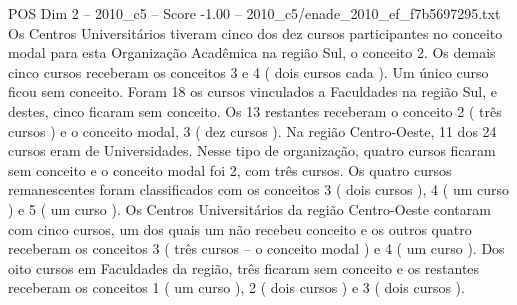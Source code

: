 \begin{textsample}{POS Dim 2 – 2010\_c5 – Score -1.00 – 2010\_c5/enade\_2010\_ef\_f7b5697295.txt}
Os Centros Universitários tiveram cinco dos dez cursos participantes no conceito modal para esta Organização Acadêmica na região Sul, o conceito 2.
Os demais cinco cursos receberam os conceitos 3 e 4 ( dois cursos cada ).
Um único curso ficou sem conceito.
Foram 18 os cursos vinculados a Faculdades na região Sul, e destes, cinco ficaram sem conceito.
Os 13 restantes receberam o conceito 2 ( três cursos ) e o conceito modal, 3 ( dez cursos ).
Na região Centro-Oeste, 11 dos 24 cursos eram de Universidades.
Nesse tipo de organização, quatro cursos ficaram sem conceito e o conceito modal foi 2, com três cursos.
Os quatro cursos remanescentes foram classificados com os conceitos 3 ( dois cursos ), 4 ( um curso ) e 5 ( um curso ).
Os Centros Universitários da região Centro-Oeste contaram com cinco cursos, um dos quais um não recebeu conceito e os outros quatro receberam os conceitos 3 ( três cursos – o conceito modal ) e 4 ( um curso ).
Dos oito cursos em Faculdades da região, três ficaram sem conceito e os restantes receberam os conceitos 1 ( um curso ), 2 ( dois cursos ) e 3 ( dois cursos ).

\end{textsample}
